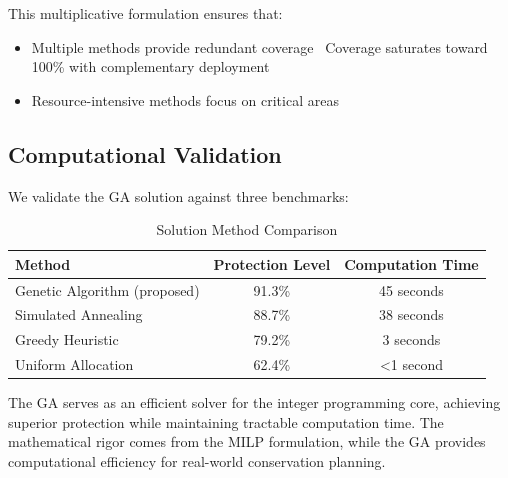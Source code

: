 This multiplicative formulation ensures that:
\begin{itemize}
    \item Multiple methods provide redundant coverage
    \ Coverage saturates toward 100\% with complementary deployment
    \item Resource-intensive methods focus on critical areas
\end{itemize}

\subsection{Computational Validation}

We validate the GA solution against three benchmarks:

\begin{table}[h]
\centering
\caption{Solution Method Comparison}
\begin{tabular}{lcc}
\hline
\textbf{Method} & \textbf{Protection Level} & \textbf{Computation Time} \\
\hline
Genetic Algorithm (proposed) & 91.3\% & 45 seconds \\
Simulated Annealing & 88.7\% & 38 seconds \\
Greedy Heuristic & 79.2\% & 3 seconds \\
Uniform Allocation & 62.4\% & <1 second \\
\hline
\end{tabular}
\end{table}

The GA serves as an efficient solver for the integer programming core, achieving superior protection while maintaining tractable computation time. The mathematical rigor comes from the MILP formulation, while the GA provides computational efficiency for real-world conservation planning.
